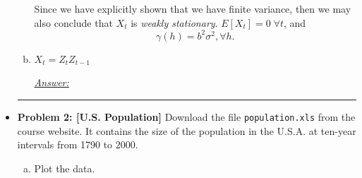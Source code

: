\documentclass[a4paper, 11pt]{article}
\begin{document}
\begin{itemize}
\begin{enumerate}[(a)]
Since we have explicitly shown that we have finite variance, then we may also conclude that $X_t$ is \emph{weakly stationary}. $E[X_t] = 0 \; \forall t$, and 
$$\gamma(h) = b^2\sigma^2, \forall h. $$

		\item $X_t = Z_tZ_{t-1}$ \newline 
		
			\underline{\emph{Answer:}} \\ 

	\end{enumerate}
	
	
	\hrule 
	\newpage 
	\item \textbf{Problem 2: [U.S. Population]} Download the file \texttt{population.xls} from the course website. It contains the size of the population in the U.S.A. at ten-year intervals from 1790 to 2000. 
	
	
	\begin{enumerate}[(a)]
		\item Plot the data. \newline 
		

\end{enumerate}
\end{itemize}
\end{document}
